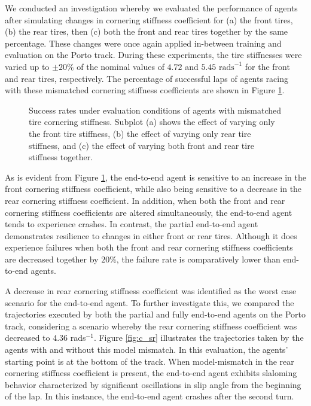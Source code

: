 We conducted an investigation whereby we evaluated the performance of agents after simulating changes in cornering stiffness coefficient for (a) the front tires, (b) the rear tires, then (c) both the front and rear tires together by the same percentage.
These changes were once again applied in-between training and evaluation on the Porto track.
During these experiments, the tire stiffnesses were varied up to $\pm 20 \%$ of the nominal values of $4.72$ and $5.45$ $\text{rads}^{-1}$ for the front and rear tires, respectively.
The percentage of successful laps of agents racing with these mismatched cornering stiffness coefficients are shown in Figure \ref{fig:c_s}.

\begin{figure}[htb!]
    \centering
    
    \caption[Success rate of agents under evaluation conditions with mismatched tire cornering stiffness]{Success rates under evaluation conditions of agents with mismatched tire cornering stiffness. Subplot (a) shows the effect of varying only the front tire stiffness, (b) the effect of varying only rear tire stiffness, and (c) the effect of varying both front and rear tire stiffness together.}
    \label{fig:c_s}
\end{figure}

As is evident from Figure \ref{fig:c_s}, the end-to-end agent is sensitive to an increase in the front cornering stiffness coefficient, while also being sensitive to a decrease in the rear cornering stiffness coefficient.
In addition, when both the front and rear cornering stiffness coefficients are altered simultaneously, the end-to-end agent tends to experience crashes. 
In contrast, the partial end-to-end agent demonstrates resilience to changes in either front or rear tires.
Although it does experience failures when both the front and rear cornering stiffness coefficients are decreased together by $20\%$, the failure rate is comparatively lower than end-to-end agents.


A decrease in rear cornering stiffness coefficient was identified as the worst case scenario for the end-to-end agent.
To further investigate this, we compared the trajectories executed by both the partial and fully end-to-end agents on the Porto track, considering a scenario whereby the rear cornering stiffness coefficient was decreased to $4.36$ rads$^{-1}$. 
Figure \ref{fig:c_sr} illustrates the trajectories taken by the agents with and without this model mismatch. 
In this evaluation, the agents' starting point is at the bottom of the track. 
When model-mismatch in the rear cornering stiffness coefficient is present, the end-to-end agent exhibits slaloming behavior characterized by significant oscillations in slip angle from the beginning of the lap.
In this instance, the end-to-end agent crashes after the second turn. 


